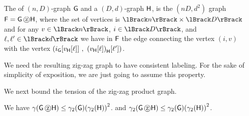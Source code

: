 \begin{defn}
    The  of $(n,D)$-graph $\mathsf{G}$ and a
    $(D,d)$-graph $\mathsf{H}$, is the $(nD, d^2)$ graph $\mathsf{F} =
    \mathsf{G} \, \text{\textcircled{z}} \mathsf{H}$, where the set of vertices is
    $\RangeI{n}\times\RangeI{D}$ and for any $v \in \RangeI{n}$, $i
    \in \RangeI{D}$, and $\ell, \ell' \in \RangeI{d}$ we have in
    $\mathsf{F}$ the edge connecting the vertex $(i,v)$ with the vertex
    $\pth[]{ \NXExt{i}{\Graph}{\MakeSBig\NXExt{v}{\GraphB}{\ell}} \,,
       \,\,
       \NXExt{\pth{\NXExt{v}{\GraphB}{\ell}\MakeSBig}}{\GraphB}{\ell'}}$.
\end{defn}

\begin{remark}
    We need the resulting zig-zag graph to have consistent
    labeling. For the sake of simplicity of exposition, we are just
    going to assume this property.
\end{remark}


We next bound the tension of the zig-zag product graph.

\begin{theorem}
    We have $\DialX{\ZProd{\Graph}{\GraphB}} \leq \BiDialX{\Graph}
    \pth[]{\BiDialX{\GraphB}}^2$.  and
    $\BiDialX{\ZProd{\Graph}{\GraphB}} \leq \BiDialX{\Graph}
    \pth[]{\BiDialX{\GraphB}}^2$.
\end{theorem}

